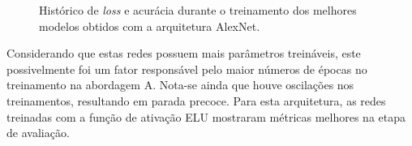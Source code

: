 \begin{figure}[h!]
 \centering
 \caption{Histórico de \emph{loss} e acurácia durante o treinamento dos melhores modelos obtidos com a arquitetura AlexNet.}
 \label{fig:treinamento-alexnet}
 \hfill
 \hfill
 \hfill
\end{figure}

Considerando que estas redes possuem mais parâmetros treináveis, este possivelmente foi um fator responsável pelo maior números de épocas no treinamento na abordagem A. Nota-se ainda que houve oscilações nos treinamentos, resultando em parada precoce. Para esta arquitetura, as redes treinadas com a função de ativação ELU mostraram métricas melhores na etapa de avaliação.

